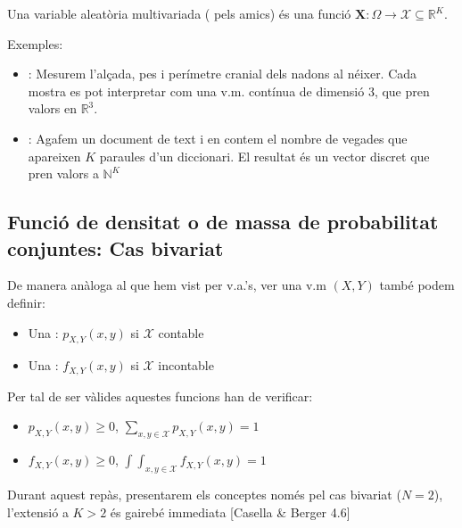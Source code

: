 \documentclass[letterpaper,10pt,english]{sphinxmanual}
\begin{document}
 Una variable aleatòria multivariada ( pels amics)
és una funció \(\mathbf{X} : \Omega \to \mathcal{X} \subseteq \mathbb{R}^K\).

Exemples:
\begin{itemize}
\item {} 
: Mesurem l’alçada, pes i perímetre cranial dels nadons al néixer. Cada mostra es pot interpretar com una v.m. contínua de dimensió 3, que pren valors en \(\mathbb{R}^3\).

\item {} 
: Agafem un document de text i en contem el nombre de vegades que apareixen \(K\) paraules d’un diccionari. El resultat és un vector discret que pren valors a \(\mathbb{N}^K\)

\end{itemize}


\subsection{Funció de densitat o de massa de probabilitat conjuntes: Cas bivariat}
\label{\detokenize{0_Intro/0_1_Repas_probabilitat:funcio-de-densitat-o-de-massa-de-probabilitat-conjuntes-cas-bivariat}}
De manera anàloga al que hem vist per v.a.’s, ver una v.m \((X, Y)\) també
podem definir:
\begin{itemize}
\item {} 
Una : \(p_{X,Y}(x, y)\) si \(\mathcal{X}\) contable

\item {} 
Una : \(f_{X,Y}(x, y)\) si \(\mathcal{X}\) incontable

\end{itemize}

Per tal de ser vàlides aquestes funcions han de verificar:
\begin{itemize}
\item {} 
\(p_{X,Y}(x, y) \geq 0\), \(\sum_{x, y \in \mathcal{X}}p_{X,Y}(x, y)=1\)

\item {} 
\(f_{X,Y}(x, y) \geq 0\), \(\int\int_{x, y \in \mathcal{X}}f_{X,Y}(x, y)=1\)

\end{itemize}

Durant aquest repàs, presentarem els conceptes només pel cas bivariat (\(N=2\)),
l’extensió a \(K>2\) és gairebé immediata {[}Casella \& Berger 4.6{]}
\end{document}
